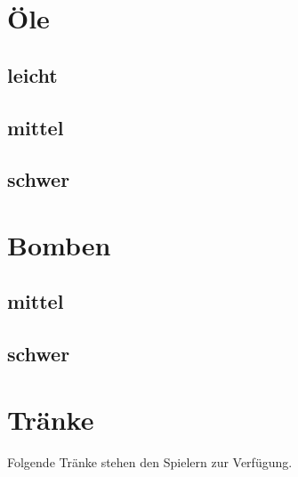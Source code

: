 \section{Öle}
\subsection{leicht}
\subsection{mittel}
\subsection{schwer}


\section{Bomben}
\subsection{mittel}
\subsection{schwer}




\section{Tränke}
Folgende Tränke stehen den Spielern zur Verfügung. 

